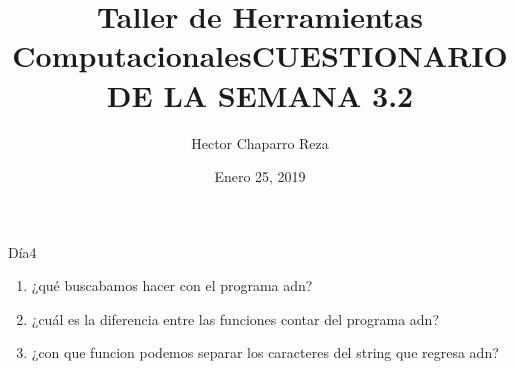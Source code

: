 \documentclass[letterpaper, 12pt, oneside]{article}
\title{\Huge{Taller de Herramientas Computacionales}}
\author{Hector Chaparro Reza}
\date{Enero 25, 2019}
\begin{document}
	\title{\Huge{CUESTIONARIO DE LA SEMANA 3.2}}	
	Día4
	\begin{enumerate}
		\item ¿qué buscabamos hacer con el programa adn?
		\item ¿cuál es la diferencia entre las funciones contar del programa adn?
		\item ¿con que funcion podemos separar los caracteres del string que regresa adn?
	\end{enumerate}
\end{document}
